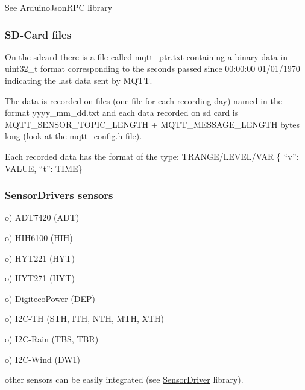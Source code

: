 See Arduino\+Json\+R\+PC library\hypertarget{index_files}{}\subsubsection{S\+D-\/\+Card files}\label{index_files}
On the sdcard there is a file called mqtt\+\_\+ptr.\+txt containing a binary data in uint32\+\_\+t format corresponding to the seconds passed since 00\+:00\+:00 01/01/1970 indicating the last data sent by M\+Q\+TT.

The data is recorded on files (one file for each recording day) named in the format yyyy\+\_\+mm\+\_\+dd.\+txt and each data recorded on sd card is M\+Q\+T\+T\+\_\+\+S\+E\+N\+S\+O\+R\+\_\+\+T\+O\+P\+I\+C\+\_\+\+L\+E\+N\+G\+TH + M\+Q\+T\+T\+\_\+\+M\+E\+S\+S\+A\+G\+E\+\_\+\+L\+E\+N\+G\+TH bytes long (look at the \hyperlink{mqtt__config_8h}{mqtt\+\_\+config.\+h} file).

Each recorded data has the format of the type\+: T\+R\+A\+N\+G\+E/\+L\+E\+V\+E\+L/\+V\+AR \{ “v”\+: V\+A\+L\+UE, “t”\+: T\+I\+ME\}\hypertarget{index_sensordriversensors}{}\subsubsection{Sensor\+Driver\textquotesingle{}s sensors}\label{index_sensordriversensors}
o) A\+D\+T7420 (A\+DT)

o) H\+I\+H6100 (H\+IH)

o) H\+Y\+T221 (H\+YT)

o) H\+Y\+T271 (H\+YT)

o) \hyperlink{namespaceDigitecoPower}{Digiteco\+Power} (D\+EP)

o) I2\+C-\/\+TH (S\+TH, I\+TH, N\+TH, M\+TH, X\+TH)

o) I2\+C-\/\+Rain (T\+BS, T\+BR)

o) I2\+C-\/\+Wind (D\+W1)

other sensors can be easily integrated (see \hyperlink{classSensorDriver}{Sensor\+Driver} library). 